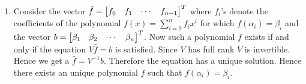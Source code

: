 \documentclass[a4paper, 11pt]{article}
\begin{document}
{\begin{enumerate}[label=(\alph*)]
\item Consider the vector $\hat{f}=\left[\begin{matrix}f_0 & f_1 & \cdots & f_{n-1}\end{matrix}\right]^T$ where $f_i$'s denote the coefficients of the polynomial $f(x)=\sum\limits_{i=0}^n f_ix^i$ for which $f(\alpha_i)=\beta_i$ and the vector $b=\left[\begin{matrix}\beta_1 & \beta_2 & \cdots & \beta_n\end{matrix}\right]^T$. Now such a polynomial $f$ exists if and only if the equation $V\hat{f}=b$ is satisfied. Since $V$ has full rank $V$ is invertible. Hence we get a $\hat{f}=V^{-1}b$. Therefore the equation has a unique solution. Hence there exists an unique polynomial $f$ such that $f(\alpha_i)=\beta_i$.
\end{enumerate}
}
\end{document}
